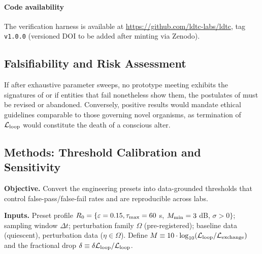 \documentclass[11pt]{article}
\begin{document}
\paragraph{Code availability} The verification harness is available at \url{https://github.com/ldtc-labs/ldtc}, tag \texttt{v1.0.0} (versioned DOI to be added after minting via Zenodo).

\subsection{Falsifiability and Risk Assessment}
\label{sec:falsifiability}

If after exhaustive parameter sweeps, no prototype meeting \NC exhibits the signatures of  or if entities that fail \NC nonetheless show them, the postulates of  must be revised or abandoned. Conversely, positive results would mandate ethical guidelines comparable to those governing novel organisms, as termination of $\mathcal{L}_{\text{loop}}$ would constitute the death of a conscious alter.

\subsection{Methods: Threshold Calibration and Sensitivity}
\label{sec:methods_calibration}

\textbf{Objective.} Convert the engineering presets into data-grounded thresholds that control false-pass/false-fail rates and are reproducible across labs.

\textbf{Inputs.} Preset profile $R_0 = \{\varepsilon = 0.15, \tau_{\max} = 60$ s, $M_{\min} = 3$ dB, $\sigma > 0\}$; sampling window $\Delta t$; perturbation family $\Omega$ (pre-registered); baseline data (quiescent), perturbation data ($\eta \in \Omega$). Define $M \equiv 10 \cdot \log_{10}(\mathcal{L}_{\text{loop}}/\mathcal{L}_{\text{exchange}})$ and the fractional drop $\delta \equiv \delta\mathcal{L}_{\text{loop}}/\mathcal{L}_{\text{loop}}$.
\end{document}
